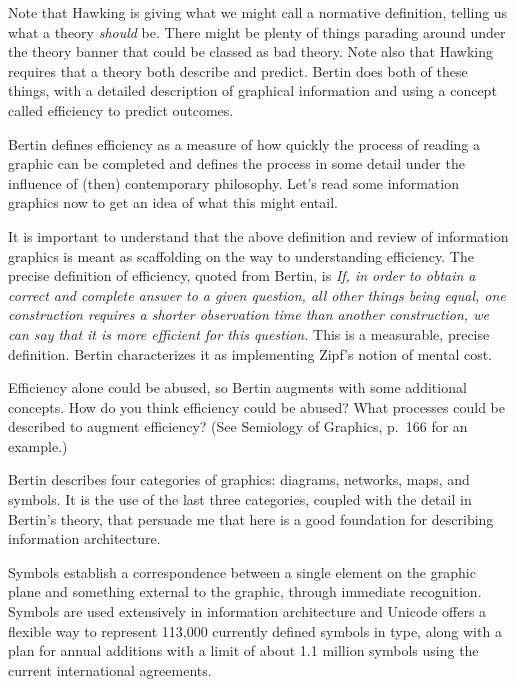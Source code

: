 Note that Hawking is giving what we might call a normative definition,
telling us what a theory \emph{should} be. There might be plenty of
things parading around under the theory banner that could be classed as
bad theory. Note also that Hawking requires that a theory both describe
and predict. Bertin does both of these things, with a detailed
description of graphical information and using a concept called
efficiency to predict outcomes.

\hypertarget{efficiency}{%
\label{efficiency}}

Bertin defines efficiency as a measure of how quickly the process of
reading a graphic can be completed and defines the process in some
detail under the influence of (then) contemporary philosophy. Let's read
some information graphics now to get an idea of what this might entail.

It is important to understand that the above definition and review of
information graphics is meant as scaffolding on the way to understanding
efficiency. The precise definition of efficiency, quoted from Bertin, is
\emph{If, in order to obtain a correct and complete answer to a given
question, all other things being equal, one construction requires a
shorter observation time than another construction, we can say that it
is more efficient for this question.} This is a measurable, precise
definition. Bertin characterizes it as implementing Zipf's notion of
mental cost.

Efficiency alone could be abused, so Bertin augments with some
additional concepts. How do you think efficiency could be abused? What
processes could be described to augment efficiency? (See Semiology of
Graphics, p.~166 for an example.)

\hypertarget{categories-of-information-graphics}{%
\label{categories-of-information-graphics}}

Bertin describes four categories of graphics: diagrams, networks, maps,
and symbols. It is the use of the last three categories, coupled with
the detail in Bertin's theory, that persuade me that here is a good
foundation for describing information architecture.

\hypertarget{symbols}{%
\label{symbols}}

Symbols establish a correspondence between a single element on the
graphic plane and something external to the graphic, through immediate
recognition. Symbols are used extensively in information architecture
and Unicode offers a flexible way to represent 113,000 currently defined
symbols in type, along with a plan for annual additions with a limit of
about 1.1 million symbols using the current international agreements.

